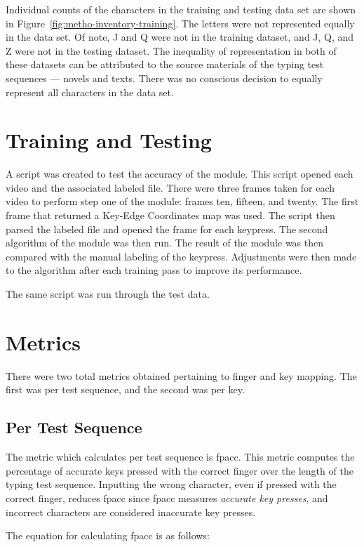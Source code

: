 \documentclass[preprint,12pt,authoryear]{elsarticle}
\begin{document}
Individual counts of the characters in the training and testing data set are
shown in Figure~\ref{fig:metho-inventory-training}. The letters were not
represented equally in the data set. Of note, J and Q were not in the training
dataset, and J, Q, and Z were not in the testing dataset. The inequality of
representation in both of these datasets can be attributed to the source
materials of the typing test sequences --- novels and texts. There was no
conscious decision to equally represent all characters in the data set.

\section{Training and Testing}
A script was created to test the accuracy of the module. This script opened each
video and the associated labeled file. There were three frames taken for each
video to perform step one of the module: frames ten, fifteen, and twenty. The
first frame that returned a Key-Edge Coordinates map was used. The script then
parsed the labeled file and opened the frame for each keypress. The second
algorithm of the module was then run. The result of the module was then compared
with the manual labeling of the keypress. Adjustments were then made to the
algorithm after each training pass to improve its performance.

The same script was run through the test data.

\section{Metrics}
\label{section:metric}

There were two total metrics obtained pertaining to finger and key mapping. The
first was per test sequence, and the second was per key.

\subsection{Per Test Sequence}
The metric which calculates per test sequence is \ac{fpacc}. This metric
computes the percentage of accurate keys pressed with the correct finger over
the length of the typing test sequence. Inputting the wrong character, even if
pressed with the correct finger, reduces \ac{fpacc} since \ac{fpacc} measures
\emph{accurate key presses}, and incorrect characters are considered inaccurate
key presses.

The equation for calculating \ac{fpacc} is as follows:
\end{document}

